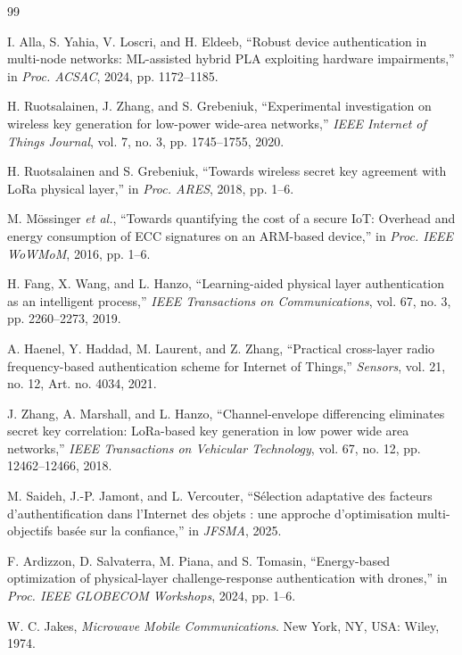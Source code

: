 \documentclass[conference,a4paper]{IEEEtran}
\begin{document}
\balance
\begin{thebibliography}{99}

I. Alla, S. Yahia, V. Loscri, and H. Eldeeb, ``Robust device authentication in multi-node networks: ML-assisted hybrid PLA exploiting hardware impairments,'' in \emph{Proc. ACSAC}, 2024, pp. 1172--1185.

H. Ruotsalainen, J. Zhang, and S. Grebeniuk, ``Experimental investigation on wireless key generation for low-power wide-area networks,'' \emph{IEEE Internet of Things Journal}, vol. 7, no. 3, pp. 1745--1755, 2020.

H. Ruotsalainen and S. Grebeniuk, ``Towards wireless secret key agreement with LoRa physical layer,'' in \emph{Proc. ARES}, 2018, pp. 1--6.

M. Mössinger \emph{et al.}, ``Towards quantifying the cost of a secure IoT: Overhead and energy consumption of ECC signatures on an ARM-based device,'' in \emph{Proc. IEEE WoWMoM}, 2016, pp. 1--6.

H. Fang, X. Wang, and L. Hanzo, ``Learning-aided physical layer authentication as an intelligent process,'' \emph{IEEE Transactions on Communications}, vol. 67, no. 3, pp. 2260--2273, 2019.

A. Haenel, Y. Haddad, M. Laurent, and Z. Zhang, ``Practical cross-layer radio frequency-based authentication scheme for Internet of Things,'' \emph{Sensors}, vol. 21, no. 12, Art. no. 4034, 2021.

J. Zhang, A. Marshall, and L. Hanzo, ``Channel-envelope differencing eliminates secret key correlation: LoRa-based key generation in low power wide area networks,'' \emph{IEEE Transactions on Vehicular Technology}, vol. 67, no. 12, pp. 12462--12466, 2018.

M. Saideh, J.-P. Jamont, and L. Vercouter, ``Sélection adaptative des facteurs d'authentification dans l'Internet des objets : une approche d'optimisation multi-objectifs basée sur la confiance,'' in \emph{JFSMA}, 2025.

F. Ardizzon, D. Salvaterra, M. Piana, and S. Tomasin, ``Energy-based optimization of physical-layer challenge-response authentication with drones,'' in \emph{Proc. IEEE GLOBECOM Workshops}, 2024, pp. 1--6.

W. C. Jakes, \emph{Microwave Mobile Communications}. New York, NY, USA: Wiley, 1974.


\end{thebibliography}
\end{document}
